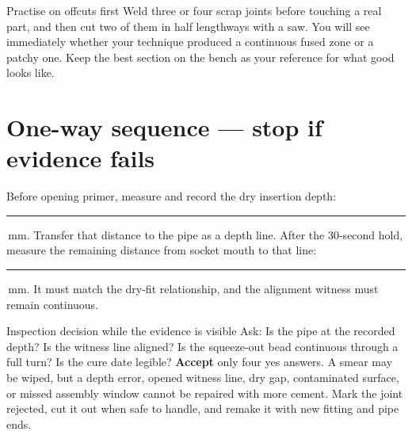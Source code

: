 
\begin{telospanel}{Practise on offcuts first}
Weld three or four scrap joints before touching a real part, and then cut two of
them in half lengthways with a saw. You will see immediately whether your
technique produced a continuous fused zone or a patchy one. Keep the best
section on the bench as your reference for what good looks like.
\end{telospanel}

\section{One-way sequence --- stop if evidence fails}
\begin{center}
\end{center}

\noindent Before opening primer, measure and record the dry insertion depth:
\rule{1.4cm}{.3pt}\,mm. Transfer that distance to the pipe as a depth line.
After the 30-second hold, measure the remaining distance from socket mouth to
that line: \rule{1.4cm}{.3pt}\,mm. It must match the dry-fit relationship, and
the alignment witness must remain continuous.

\begin{gate}{Inspection decision while the evidence is visible}
Ask: Is the pipe at the recorded depth? Is the witness line aligned? Is the
squeeze-out bead continuous through a full turn? Is the cure date legible?
\textbf{Accept} only four yes answers. A smear may be wiped, but a depth error,
opened witness line, dry gap, contaminated surface, or missed assembly window
cannot be repaired with more cement. Mark the joint rejected, cut it out when
safe to handle, and remake it with new fitting and pipe ends.
\end{gate}

